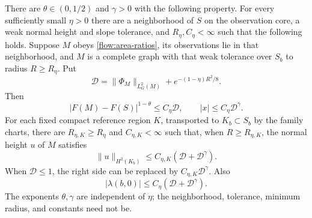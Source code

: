 \begin{proposition}
\label{flow:localized}
There are $\theta\in(0,1/2)$ and $\gamma>0$ with the following property.
For every sufficiently small $\eta>0$ there are a neighborhood of $S$
on the observation core, a weak normal height and slope tolerance,
and $R_\eta,C_\eta<\infty$ such that the following holds.  Suppose
$M$ obeys \eqref{flow:area-ratios}, its observations lie in that
neighborhood, and $M$ is a complete graph with that weak tolerance over
$S_b$ to radius $R\ge R_\eta$.  Put
\begin{equation}\label{flow:D}
 \mathcal D=\|\Phi_M\|_{L^2_G(M)}
              +e^{-(1-\eta)R^2/8}.
\end{equation}
Then
\begin{equation}\label{flow:localized-conclusions}
 |F(M)-F(S)|^{1-\theta}\le C_\eta\mathcal D,
 \qquad |x|\le C_\eta\mathcal D^\gamma .
\end{equation}
For each fixed compact reference region $K$, transported to $K_b\subset
S_b$ by the family charts, there are $R_{\eta,K}\ge R_\eta$ and
$C_{\eta,K}<\infty$ such that, when $R\ge R_{\eta,K}$, the normal
height $u$ of $M$ satisfies
\begin{equation}\label{flow:compact-height}
 \|u\|_{H^2(K_b)}\le C_{\eta,K}
        (\mathcal D+\mathcal D^\gamma).
\end{equation}
When $\mathcal D\le1$, the right side can be replaced by
$C_{\eta,K}\mathcal D^\gamma$.  Also
\begin{equation}\label{flow:base-multiplier}
 |\lambda(b,0)|\le C_\eta
       (\mathcal D+\mathcal D^\gamma).
\end{equation}
The exponents $\theta,\gamma$ are independent of $\eta$; the
neighborhood, tolerance, minimum radius, and constants need not be.
\end{proposition}

